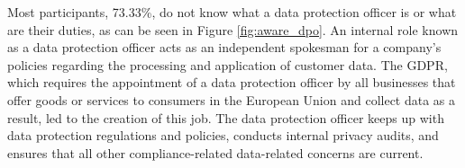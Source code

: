 


Most participants, 73.33\%, do not know what a data protection officer is
or what are their duties, as can be seen in Figure \ref{fig:aware_dpo}.
An internal role known as a data protection officer acts as an independent
spokesman for a company's policies regarding the processing and
application of customer data. The GDPR, which requires the appointment
of a data protection officer by all businesses that offer goods or
services to consumers in the European Union and collect data as a
result, led to the creation of this job. The data protection officer
keeps up with data protection regulations and policies, conducts
internal privacy audits, and ensures that all other compliance-related
data-related concerns are current.

